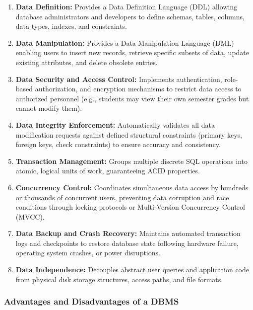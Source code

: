 \begin{enumerate}
\item \textbf{Data Definition:} Provides a Data Definition Language (DDL) allowing database administrators and developers to define schemas, tables, columns, data types, indexes, and constraints.
\item \textbf{Data Manipulation:} Provides a Data Manipulation Language (DML) enabling users to insert new records, retrieve specific subsets of data, update existing attributes, and delete obsolete entries.
\item \textbf{Data Security and Access Control:} Implements authentication, role-based authorization, and encryption mechanisms to restrict data access to authorized personnel (e.g., students may view their own semester grades but cannot modify them).
\item \textbf{Data Integrity Enforcement:} Automatically validates all data modification requests against defined structural constraints (primary keys, foreign keys, check constraints) to ensure accuracy and consistency.
\item \textbf{Transaction Management:} Groups multiple discrete SQL operations into atomic, logical units of work, guaranteeing ACID properties.
\item \textbf{Concurrency Control:} Coordinates simultaneous data access by hundreds or thousands of concurrent users, preventing data corruption and race conditions through locking protocols or Multi-Version Concurrency Control (MVCC).
\item \textbf{Data Backup and Crash Recovery:} Maintains automated transaction logs and checkpoints to restore database state following hardware failure, operating system crashes, or power disruptions.
\item \textbf{Data Independence:} Decouples abstract user queries and application code from physical disk storage structures, access paths, and file formats.
\end{enumerate}

\subsubsection{Advantages and Disadvantages of a DBMS}

